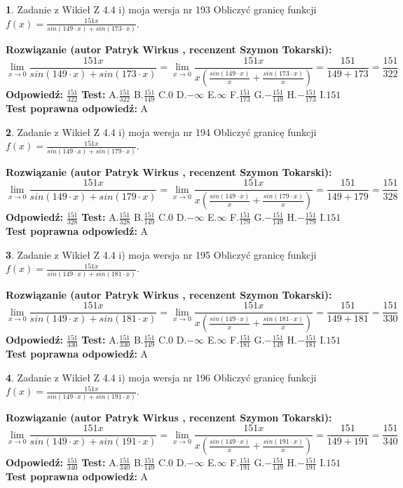 \documentclass[12pt, a4paper]{article}
\theoremstyle{definition} %
\newtheorem{zad}{}
\newcommand{\zadStart}[1]{\begin{zad}#1\newline}
\newcommand{\zadStop}{\end{zad}}
\newcommand{\rozwStart}[2]{\noindent \textbf{Rozwiązanie (autor #1 , recenzent #2): }\newline}
\newcommand{\rozwStop}{\newline}
\newcommand{\odpStart}{\noindent \textbf{Odpowiedź:}\newline}
\newcommand{\odpStop}{\newline}
\newcommand{\testStart}{\noindent \textbf{Test:}\newline}
\newcommand{\testStop}{\newline}
\newcommand{\kluczStart}{\noindent \textbf{Test poprawna odpowiedź:}\newline}
\newcommand{\kluczStop}{\newline}
\begin{document}
\zadStart{Zadanie z Wikieł Z 4.4 i) moja wersja nr 193}
Obliczyć granicę funkcji $f(x)=\frac{151x}{sin(149\cdot x) +sin(173\cdot x)}$.
\zadStop
\rozwStart{Patryk Wirkus}{Szymon Tokarski}
$$\lim\limits_{x\to 0}\frac{151x}{sin(149\cdot x) +sin(173\cdot x)}=\lim\limits_{x\to 0}\frac{151x}{x(\frac{sin(149\cdot x)}{x}+\frac{sin(173\cdot x)}{x})}=\frac{151}{149+173} = \frac{151}{322}$$
\rozwStop
\odpStart
$\frac{151}{322}$
\odpStop
\testStart
A.$\frac{151}{322}$
B.$\frac{151}{149}$
C.$0$
D.$-\infty$
E.$\infty$
F.$\frac{151}{173}$
G.$-\frac{151}{149}$
H.$-\frac{151}{173}$
I.$151$
\testStop
\kluczStart
A
\kluczStop



\zadStart{Zadanie z Wikieł Z 4.4 i) moja wersja nr 194}
Obliczyć granicę funkcji $f(x)=\frac{151x}{sin(149\cdot x) +sin(179\cdot x)}$.
\zadStop
\rozwStart{Patryk Wirkus}{Szymon Tokarski}
$$\lim\limits_{x\to 0}\frac{151x}{sin(149\cdot x) +sin(179\cdot x)}=\lim\limits_{x\to 0}\frac{151x}{x(\frac{sin(149\cdot x)}{x}+\frac{sin(179\cdot x)}{x})}=\frac{151}{149+179} = \frac{151}{328}$$
\rozwStop
\odpStart
$\frac{151}{328}$
\odpStop
\testStart
A.$\frac{151}{328}$
B.$\frac{151}{149}$
C.$0$
D.$-\infty$
E.$\infty$
F.$\frac{151}{179}$
G.$-\frac{151}{149}$
H.$-\frac{151}{179}$
I.$151$
\testStop
\kluczStart
A
\kluczStop



\zadStart{Zadanie z Wikieł Z 4.4 i) moja wersja nr 195}
Obliczyć granicę funkcji $f(x)=\frac{151x}{sin(149\cdot x) +sin(181\cdot x)}$.
\zadStop
\rozwStart{Patryk Wirkus}{Szymon Tokarski}
$$\lim\limits_{x\to 0}\frac{151x}{sin(149\cdot x) +sin(181\cdot x)}=\lim\limits_{x\to 0}\frac{151x}{x(\frac{sin(149\cdot x)}{x}+\frac{sin(181\cdot x)}{x})}=\frac{151}{149+181} = \frac{151}{330}$$
\rozwStop
\odpStart
$\frac{151}{330}$
\odpStop
\testStart
A.$\frac{151}{330}$
B.$\frac{151}{149}$
C.$0$
D.$-\infty$
E.$\infty$
F.$\frac{151}{181}$
G.$-\frac{151}{149}$
H.$-\frac{151}{181}$
I.$151$
\testStop
\kluczStart
A
\kluczStop



\zadStart{Zadanie z Wikieł Z 4.4 i) moja wersja nr 196}
Obliczyć granicę funkcji $f(x)=\frac{151x}{sin(149\cdot x) +sin(191\cdot x)}$.
\zadStop
\rozwStart{Patryk Wirkus}{Szymon Tokarski}
$$\lim\limits_{x\to 0}\frac{151x}{sin(149\cdot x) +sin(191\cdot x)}=\lim\limits_{x\to 0}\frac{151x}{x(\frac{sin(149\cdot x)}{x}+\frac{sin(191\cdot x)}{x})}=\frac{151}{149+191} = \frac{151}{340}$$
\rozwStop
\odpStart
$\frac{151}{340}$
\odpStop
\testStart
A.$\frac{151}{340}$
B.$\frac{151}{149}$
C.$0$
D.$-\infty$
E.$\infty$
F.$\frac{151}{191}$
G.$-\frac{151}{149}$
H.$-\frac{151}{191}$
I.$151$
\testStop
\kluczStart
A
\kluczStop
\end{document}
